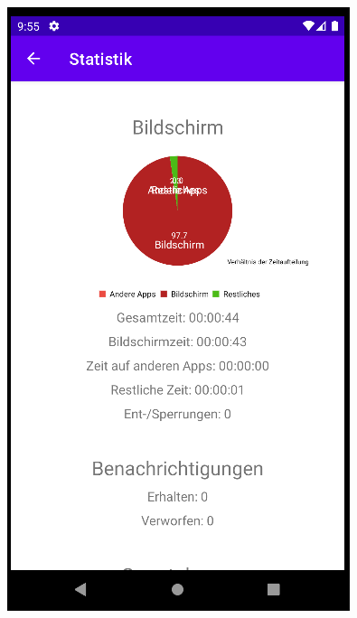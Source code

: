\documentclass[ngerman]{tutorial}
\begin{document}
\begin{center}
    \includegraphics[scale=0.45]{stats_complete_1.png}
\end{center}
\end{document}
